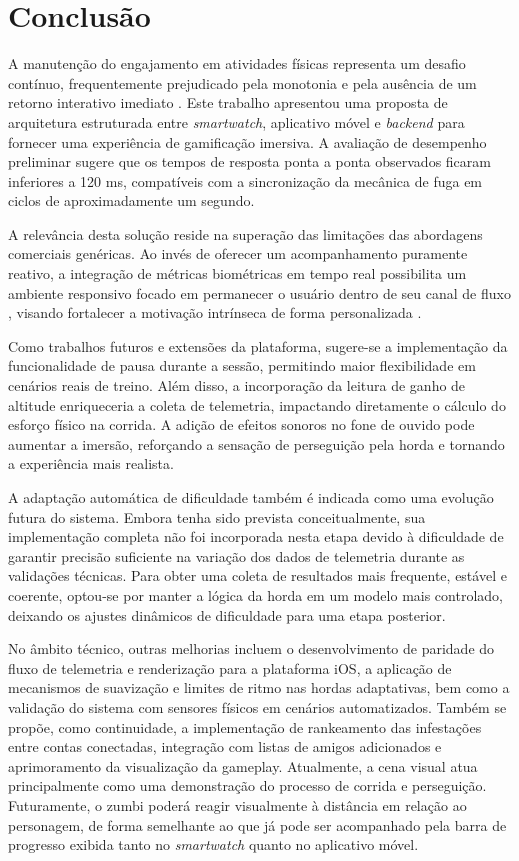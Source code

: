 \section{Conclusão}

A manutenção do engajamento em atividades físicas representa um desafio contínuo, frequentemente prejudicado pela monotonia e pela ausência de um retorno interativo imediato \cite{plangger2022little}. Este trabalho apresentou uma proposta de arquitetura estruturada entre \textit{smartwatch}, aplicativo móvel e \textit{backend} para fornecer uma experiência de gamificação imersiva. A avaliação de desempenho preliminar sugere que os tempos de resposta ponta a ponta observados ficaram inferiores a 120 ms, compatíveis com a sincronização da mecânica de fuga em ciclos de aproximadamente um segundo.

A relevância desta solução reside na superação das limitações das abordagens comerciais genéricas. Ao invés de oferecer um acompanhamento puramente reativo, a integração de métricas biométricas em tempo real possibilita um ambiente responsivo focado em permanecer o usuário dentro de seu canal de fluxo \cite{csikszentmihalyi1989optimal}, visando fortalecer a motivação intrínseca de forma personalizada \cite{cernev2012autodeterminacao}.

Como trabalhos futuros e extensões da plataforma, sugere-se a implementação da funcionalidade de pausa durante a sessão, permitindo maior flexibilidade em cenários reais de treino. Além disso, a incorporação da leitura de ganho de altitude enriqueceria a coleta de telemetria, impactando diretamente o cálculo do esforço físico na corrida. A adição de efeitos sonoros no fone de ouvido pode aumentar a imersão, reforçando a sensação de perseguição pela horda e tornando a experiência mais realista.

A adaptação automática de dificuldade também é indicada como uma evolução futura do sistema. Embora tenha sido prevista conceitualmente, sua implementação completa não foi incorporada nesta etapa devido à dificuldade de garantir precisão suficiente na variação dos dados de telemetria durante as validações técnicas. Para obter uma coleta de resultados mais frequente, estável e coerente, optou-se por manter a lógica da horda em um modelo mais controlado, deixando os ajustes dinâmicos de dificuldade para uma etapa posterior.

No âmbito técnico, outras melhorias incluem o desenvolvimento de paridade do fluxo de telemetria e renderização para a plataforma iOS, a aplicação de mecanismos de suavização e limites de ritmo nas hordas adaptativas, bem como a validação do sistema com sensores físicos em cenários automatizados. Também se propõe, como continuidade, a implementação de rankeamento das infestações entre contas conectadas, integração com listas de amigos adicionados e aprimoramento da visualização da gameplay. Atualmente, a cena visual atua principalmente como uma demonstração do processo de corrida e perseguição. Futuramente, o zumbi poderá reagir visualmente à distância em relação ao personagem, de forma semelhante ao que já pode ser acompanhado pela barra de progresso exibida tanto no \textit{smartwatch} quanto no aplicativo móvel.